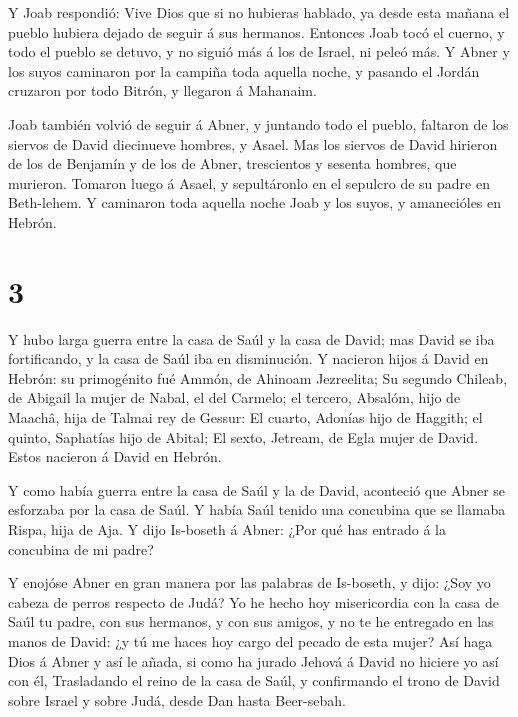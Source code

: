 Y Joab respondió: Vive Dios que si no hubieras hablado, ya
desde esta mañana el pueblo hubiera dejado de seguir á sus hermanos.
 Entonces Joab tocó el cuerno, y todo el pueblo se detuvo,
y no siguió más á los de Israel, ni peleó más.  Y Abner y
los suyos caminaron por la campiña toda aquella noche, y pasando el
Jordán cruzaron por todo Bitrón, y llegaron á Mahanaim.

 Joab también volvió de seguir á Abner, y juntando todo el
pueblo, faltaron de los siervos de David diecinueve hombres, y Asael.
 Mas los siervos de David hirieron de los de Benjamín y de
los de Abner, trescientos y sesenta hombres, que murieron. Tomaron luego
á Asael, y sepultáronlo en el sepulcro de su padre en Beth-lehem.
 Y caminaron toda aquella noche Joab y los suyos, y
amanecióles en Hebrón.

\hypertarget{section-2}{%
\section{3}\label{section-2}}

 Y hubo larga guerra entre la casa de Saúl y la casa de
David; mas David se iba fortificando, y la casa de Saúl iba en
disminución.  Y nacieron hijos á David en Hebrón: su
primogénito fué Ammón, de Ahinoam Jezreelita;  Su segundo
Chileab, de Abigail la mujer de Nabal, el del Carmelo; el tercero,
Absalóm, hijo de Maachâ, hija de Talmai rey de Gessur:  El
cuarto, Adonías hijo de Haggith; el quinto, Saphatías hijo de Abital;
 El sexto, Jetream, de Egla mujer de David. Estos nacieron á
David en Hebrón.

 Y como había guerra entre la casa de Saúl y la de David,
aconteció que Abner se esforzaba por la casa de Saúl.  Y
había Saúl tenido una concubina que se llamaba Rispa, hija de Aja. Y
dijo Is-boseth á Abner: ¿Por qué has entrado á la concubina de mi padre?

 Y enojóse Abner en gran manera por las palabras de
Is-boseth, y dijo: ¿Soy yo cabeza de perros respecto de Judá? Yo he
hecho hoy misericordia con la casa de Saúl tu padre, con sus hermanos, y
con sus amigos, y no te he entregado en las manos de David: ¿y tú me
haces hoy cargo del pecado de esta mujer?  Así haga Dios á
Abner y así le añada, si como ha jurado Jehová á David no hiciere yo así
con él,  Trasladando el reino de la casa de Saúl, y
confirmando el trono de David sobre Israel y sobre Judá, desde Dan hasta
Beer-sebah.

